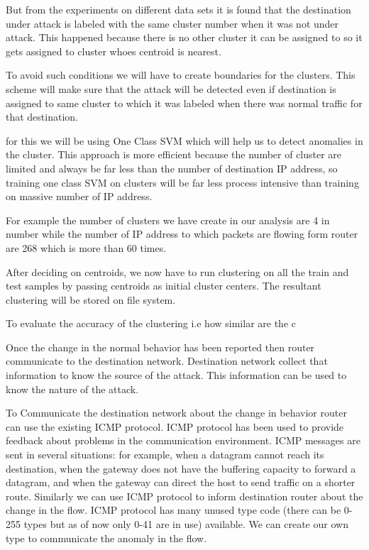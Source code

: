 \documentclass[10pt,oneside,a4paper]{article}
\begin{document}
But from the experiments on different data sets it is found that the destination under attack is labeled with the same cluster number when it was not under attack. This happened because there is no other cluster it can be assigned to so it gets assigned to cluster whoes centroid is nearest.

To avoid such conditions we will have to create boundaries for the clusters. This scheme will make sure that the attack will be detected even if destination is assigned to same cluster to which it was labeled when there was normal traffic for that destination.

for this we will be using One Class SVM which will help us to detect anomalies in the cluster. This approach is more efficient because the number of cluster are limited and always be far less than the number of destination IP address, so training one class SVM on clusters will be far less process intensive than training on massive number of IP address.

For example the number of clusters we have create in our analysis are 4 in number while the number of IP address to which packets are flowing form router are 268 which is more than 60 times.


After deciding on centroids, we now have to run clustering on all the train and test samples by passing centroids as initial cluster centers. The resultant clustering will be stored on file system.

To evaluate the accuracy of the clustering i.e how similar are the c

Once the change in the normal behavior has been reported then router communicate to the destination network. Destination network collect that information to know the source of the attack. This information can be used to know the nature of the attack.

To Communicate the destination network about the change in behavior router can use the existing ICMP protocol. ICMP protocol has been used to provide feedback about problems in the communication environment. ICMP messages are sent in several situations:  for example, when a datagram cannot reach its destination, when the gateway does not have the buffering capacity to forward a datagram, and when the gateway can direct the host to send traffic on a shorter route.\cite{icmp} Similarly we can use ICMP protocol to inform destination router about the change in the flow. ICMP protocol has many unused type code (there can be 0-255 types but as of now only 0-41 are in use) available. We can create our own type to communicate the anomaly in the flow.
\end{document}
